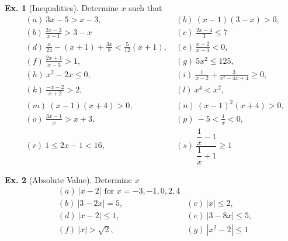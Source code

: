 \documentclass[10pt,a4paper]{book}
\theoremstyle{definition}\newtheorem{definition}{Definition}
\theoremstyle{definition}\newtheorem{fact}{Fact}
\theoremstyle{definition}\newtheorem{ex}{Ex.}
\theoremstyle{definition}\newtheorem{project}{Project}
\theoremstyle{definition}\newtheorem{problem}{Problem}
\theoremstyle{definition}\newtheorem{example}{Example}
\numberwithin{theorem}{chapter}
\numberwithin{corollary}{chapter}
\numberwithin{assumption}{chapter}
\numberwithin{definition}{chapter}
\numberwithin{prop}{chapter}
\numberwithin{notation}{chapter}
\numberwithin{problem}{chapter}
\numberwithin{example}{chapter}
\numberwithin{fact}{chapter}
\numberwithin{ex}{chapter}
\begin{document}
	\begin{ex}[Inequalities] Determine $x$ such that
		\begin{align*}
			& (a) \ 3x - 5 > x - 3, \                                          
			& (b) \ (x-1)(3-x) > 0,                                            \\
			& (b) \ \frac{2x-3}{x-1} > 3-x \                                   
			& (c) \ \frac{2x-4}{3} \leq 7                                      \\
			& (d) \ \frac{x}{24} - (x+1) + \frac{3x}{8} < \frac{5}{12}(x+1), \ 
			& (e) \ \frac{x+2}{x-1} < 0,                                       \\
			& (f) \ \frac{2x+1}{x-3} > 1, \                                    
			& (g) \ 5 x^2 \leq 125,                                            \\
			& (h) \ x^2 - 2x \leq 0, \                                         
			& (i) \ \frac{1}{x-2} + \frac{3}{x^2 - 4x + 4} \geq 0,             \\
			& (k) \ \frac{-x-2}{x+2} > 2,                                      
			& (l) \ x^4 < x^2,                                                 \\
			& (m) \ (x-1)(x+4) > 0, \                                          
			& (n) \ (x-1)^2 (x+4) > 0,                                         \\
			& (o) \ \frac{3x-1}{x} > x+3, \                                    
			& (p) \ -5 < \frac{1}{x} < 0,                                      \\
			& (r) \ 1 \leq 2x - 1 < 16, \                                      
			& (s) \ \dfrac{\dfrac{1}{x} - 1}{\dfrac{1}{x} + 1} \geq 1          
		\end{align*}
	\end{ex}
	
	\begin{ex}[Absolute Value] Determine $x$
		\begin{align*}
			& (a)\ |x-2| \text{ for $x= -3, -1, 0, 2, 4$} \\
			& (b) \ |3-2x| = 5, \                         
			& (c) \ |x| \leq 2,                           \\
			& (d) \ |x-2| \leq 1, \                       
			& (e) \ |3-8x| \leq 5,                        \\
			& (f) \ |x| > \sqrt{2}, \                     
			& (g) \ |x^2 - 2| \leq 1                      
		\end{align*}	
	\end{ex}
	
\end{document}
